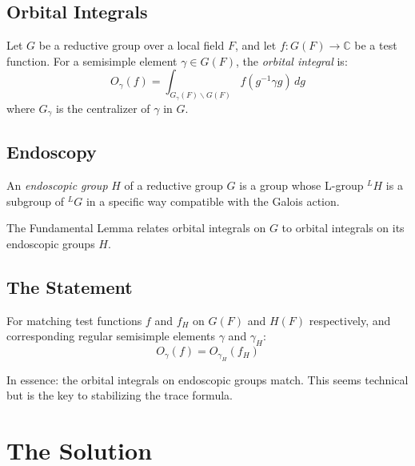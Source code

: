 \subsection{Orbital Integrals}

\begin{definition}
Let $G$ be a reductive group over a local field $F$, and let $f: G(F) \to \mathbb{C}$ be a test function. For a semisimple element $\gamma \in G(F)$, the \emph{orbital integral} is:
\begin{equation}
O_\gamma(f) = \int_{G_\gamma(F) \backslash G(F)} f(g^{-1}\gamma g) \, dg
\end{equation}
where $G_\gamma$ is the centralizer of $\gamma$ in $G$.
\end{definition}

\subsection{Endoscopy}

\begin{definition}
An \emph{endoscopic group} $H$ of a reductive group $G$ is a group whose L-group $^LH$ is a subgroup of $^LG$ in a specific way compatible with the Galois action.
\end{definition}

The Fundamental Lemma relates orbital integrals on $G$ to orbital integrals on its endoscopic groups $H$.

\subsection{The Statement}

\begin{conjecture}
For matching test functions $f$ and $f_H$ on $G(F)$ and $H(F)$ respectively, and corresponding regular semisimple elements $\gamma$ and $\gamma_H$:
\begin{equation}
O_\gamma(f) = O_{\gamma_H}(f_H)
\end{equation}
\end{conjecture}

In essence: the orbital integrals on endoscopic groups match. This seems technical but is the key to stabilizing the trace formula.

\section{The Solution}

